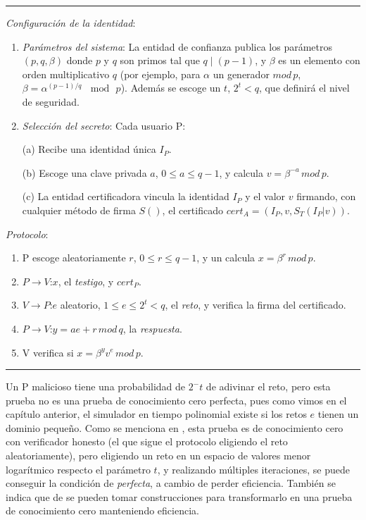 \rule{\textwidth}{1pt}
\begin{algorithm}
	\hfil
	
	\textit{Configuración de la identidad}:
	\begin{enumerate}
		\item \textit{Parámetros del sistema}: La entidad de confianza publica los parámetros $(p,q,\beta)$ donde $p$ y $q$ son primos tal que $q\mid (p-1)$, y $\beta$ es un elemento con orden multiplicativo $q$ (por ejemplo, para $\alpha$ un generador $mod\,p$, $\beta=\alpha^{(p-1)/q}\,\mod\,p$). Además se escoge un $t$, $2^t < q$, que definirá el nivel de seguridad.
		
				
		\item \textit{Selección del secreto}: Cada usuario P:
		
		\subitem (a) Recibe una identidad única $I_P$.
		
		\subitem (b) Escoge una clave privada $a$, $0\leq a \leq q-1$, y calcula $v = \beta^{-a}\, mod\, p$.
		
		\subitem (c) La entidad certificadora vincula la identidad $I_P$ y el valor $v$ firmando, con cualquier método de firma $S()$, el certificado $cert_A = (I_P, v, S_T(I_P|v))$.
		
	\end{enumerate}
	
	
	\textit{Protocolo}:
	\begin{enumerate}
		\item P escoge aleatoriamente $r$, $0\leq r\leq q-1$, y un calcula $x=\beta^r\,mod\,p$.
		\item $P \rightarrow V$:\quad $x$, el \textit{testigo}, y $cert_P$.
		\item $V \rightarrow P$:\quad $e$ aleatorio, $1\leq e\leq 2^t<q$, el \textit{reto}, y verifica la firma del certificado.
		\item $P \rightarrow V$:\quad $y=ae+r\, mod\, q$, la \textit{respuesta}.
		\item V verifica si \quad $ x = \beta^y v^e \, mod \, p$.
	\end{enumerate}
	
\end{algorithm}
\rule{\textwidth}{1pt}

\hfil

Un P malicioso tiene una probabilidad de $2^-t$ de adivinar el reto, pero esta prueba no es una prueba de conocimiento cero perfecta, pues como vimos en el capítulo anterior, el simulador en tiempo polinomial existe si los retos $e$ tienen un dominio pequeño. Como se menciona en \citep{idemixSpec}, esta prueba es de conocimiento cero con verificador honesto (el que sigue el protocolo eligiendo el reto aleatoriamente), pero eligiendo un reto en un espacio de valores menor logarítmico respecto el parámetro $t$, y realizando múltiples iteraciones, se puede conseguir la condición de \textit{perfecta}, a cambio de perder eficiencia. También se indica que de \citep{Dam00} se pueden tomar construcciones para transformarlo en una prueba de conocimiento cero manteniendo eficiencia.


